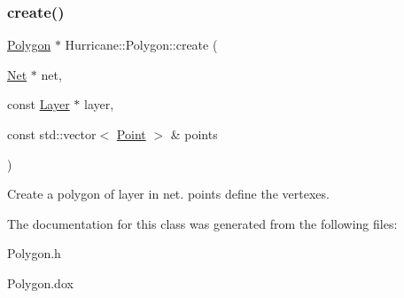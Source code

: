 \subsubsection{\texorpdfstring{create()}{create()}}
{\footnotesize\ttfamily \hyperlink{classHurricane_1_1Polygon}{Polygon} $\ast$ Hurricane\+::\+Polygon\+::create (\begin{DoxyParamCaption}\item[{\hyperlink{classHurricane_1_1Net}{Net} $\ast$}]{net,  }\item[{const \hyperlink{classHurricane_1_1Layer}{Layer} $\ast$}]{layer,  }\item[{const std\+::vector$<$ \hyperlink{classHurricane_1_1Point}{Point} $>$ \&}]{points }\end{DoxyParamCaption})\hspace{0.3cm}{\ttfamily [static]}}

Create a polygon of {\ttfamily layer} in {\ttfamily net}. {\ttfamily points} define the vertexes. 

The documentation for this class was generated from the following files\+:\begin{DoxyCompactItemize}
\item 
Polygon.\+h\item 
Polygon.\+dox\end{DoxyCompactItemize}

